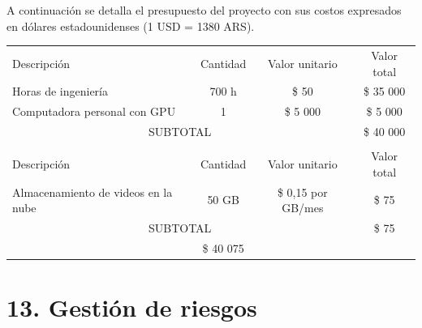 \documentclass[
11pt, %
]{charter}
\begin{document}
A continuación se detalla el presupuesto del proyecto con sus costos expresados en dólares estadounidenses (1 USD = 1380 ARS).

\begin{table}[htpb]
\centering
\begin{tabularx}{\linewidth}{@{}|X|c|r|r|@{}}
\hline
\rowcolor[HTML]{C0C0C0} 
\multicolumn{4}{|c|}{\cellcolor[HTML]{C0C0C0}COSTOS DIRECTOS} \\ \hline
\rowcolor[HTML]{C0C0C0} 
Descripción &
  \multicolumn{1}{c|}{\cellcolor[HTML]{C0C0C0}Cantidad} &
  \multicolumn{1}{c|}{\cellcolor[HTML]{C0C0C0}Valor unitario} &
  \multicolumn{1}{c|}{\cellcolor[HTML]{C0C0C0}Valor total} \\ \hline
  
 \multicolumn{1}{|l|}{Horas de ingeniería} &
  \multicolumn{1}{c|}{700 h} & 
  \multicolumn{1}{c|}{\$ 50} &
  \multicolumn{1}{c|}{\$ 35 000} \\ \hline
 
  \multicolumn{1}{|l|}{Computadora personal con GPU} &
 \multicolumn{1}{c|}{1} & 
 \multicolumn{1}{c|}{\$ 5 000} &
 \multicolumn{1}{c|}{\$ 5 000} \\ \hline

\multicolumn{3}{|c|}{SUBTOTAL} &
  \multicolumn{1}{c|}{\$ 40 000} \\ \hline
\rowcolor[HTML]{C0C0C0} 
\multicolumn{4}{|c|}{\cellcolor[HTML]{C0C0C0}COSTOS INDIRECTOS} \\ \hline
\rowcolor[HTML]{C0C0C0} 
Descripción &
  \multicolumn{1}{c|}{\cellcolor[HTML]{C0C0C0}Cantidad} &
  \multicolumn{1}{c|}{\cellcolor[HTML]{C0C0C0}Valor unitario} &
  \multicolumn{1}{c|}{\cellcolor[HTML]{C0C0C0}Valor total} \\ \hline
 \multicolumn{1}{|l|}{Almacenamiento de videos en la nube } &
\multicolumn{1}{c|}{50 GB} & 
\multicolumn{1}{c|}{\$ 0,15 por GB/mes} &
\multicolumn{1}{c|}{\$ 75} \\ \hline
\multicolumn{3}{|c|}{SUBTOTAL} &
  \multicolumn{1}{c|}{\$ 75} \\ \hline
\rowcolor[HTML]{C0C0C0}
\multicolumn{3}{|c|}{TOTAL} &
  \multicolumn{1}{|c|}{\$ 40 075} \\ \hline
\end{tabularx}%
\end{table}


\section{13. Gestión de riesgos}
\label{sec:riesgos}
\end{document}
